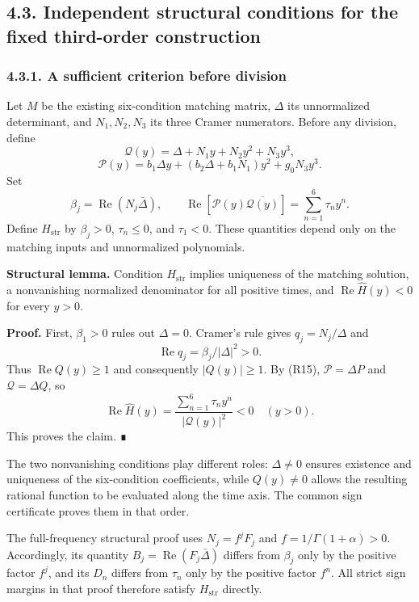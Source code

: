 \documentclass[a4paper,11pt]{article}
\begin{document}
\subsection*{4.3. Independent structural conditions for the fixed third-order construction}

\subsubsection*{4.3.1. A sufficient criterion before division}

Let \(M\) be the existing six-condition matching matrix, \(\Delta\) its unnormalized determinant, and \(N_1,N_2,N_3\) its three Cramer numerators. Before any division, define
\[
\mathcal Q(y)=\Delta+N_1y+N_2y^2+N_3y^3,
\]
\[
\mathcal P(y)=b_1\Delta y+(b_2\Delta+b_1N_1)y^2+g_0N_3y^3.
\tag{R15}
\]
Set
\[
\beta_j=\operatorname{Re}(N_j\bar\Delta),\qquad
\operatorname{Re}[\mathcal P(y)\overline{\mathcal Q(y)}]
=\sum_{n=1}^6\tau_ny^n.
\tag{R16}
\]
Define \(H_{\mathrm{str}}\) by \(\beta_j>0\), \(\tau_n\le0\), and \(\tau_1<0\). These quantities depend only on the matching inputs and unnormalized polynomials.

\textbf{Structural lemma.} Condition \(H_{\mathrm{str}}\) implies uniqueness of the matching solution, a nonvanishing normalized denominator for all positive times, and \(\operatorname{Re}\widehat H(y)<0\) for every \(y>0\).

\textbf{Proof.} First, \(\beta_1>0\) rules out \(\Delta=0\). Cramer's rule gives \(q_j=N_j/\Delta\) and
\[
\operatorname{Re}q_j=\beta_j/|\Delta|^2>0.
\]
Thus \(\operatorname{Re}Q(y)\ge1\) and consequently \(|Q(y)|\ge1\). By (R15), \(\mathcal P=\Delta P\) and \(\mathcal Q=\Delta Q\), so
\[
\operatorname{Re}\widehat H(y)
=\frac{\sum_{n=1}^6\tau_ny^n}{|\mathcal Q(y)|^2}<0\quad(y>0).
\tag{R17}
\]
This proves the claim. ∎

The two nonvanishing conditions play different roles: \(\Delta\ne0\) ensures existence and uniqueness of the six-condition coefficients, while \(Q(y)\ne0\) allows the resulting rational function to be evaluated along the time axis. The common sign certificate proves them in that order.

The full-frequency structural proof uses \(N_j=f^jF_j\) and \(f=1/\Gamma(1+\alpha)>0\). Accordingly, its quantity \(B_j=\operatorname{Re}(F_j\bar\Delta)\) differs from \(\beta_j\) only by the positive factor \(f^j\), and its \(D_n\) differs from \(\tau_n\) only by the positive factor \(f^n\). All strict sign margins in that proof therefore satisfy \(H_{\mathrm{str}}\) directly.
\end{document}
